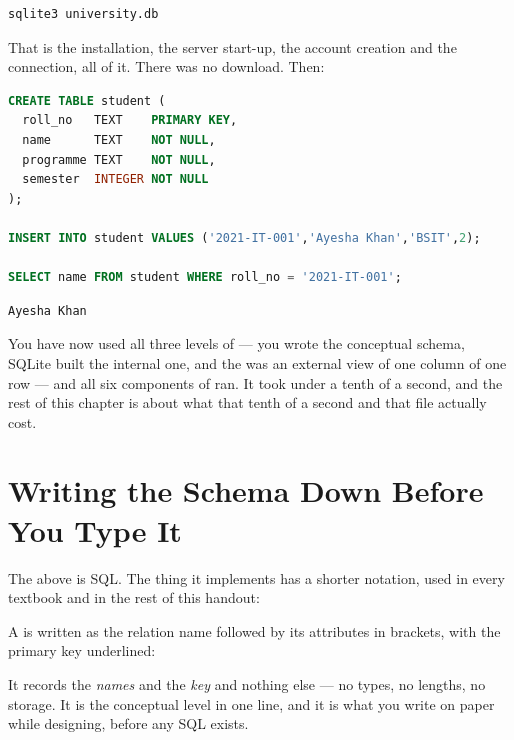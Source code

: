 \begin{lstlisting}[language=bash]
sqlite3 university.db
\end{lstlisting}

That is the installation, the server start-up, the account creation and the
connection, all of it. There was no download. Then:

\begin{lstlisting}[language=sql]
CREATE TABLE student (
  roll_no   TEXT    PRIMARY KEY,
  name      TEXT    NOT NULL,
  programme TEXT    NOT NULL,
  semester  INTEGER NOT NULL
);

INSERT INTO student VALUES ('2021-IT-001','Ayesha Khan','BSIT',2);

SELECT name FROM student WHERE roll_no = '2021-IT-001';
\end{lstlisting}

\begin{lstlisting}
Ayesha Khan
\end{lstlisting}

You have now used all three levels of  --- you wrote the
conceptual schema, SQLite built the internal one, and the  was an
external view of one column of one row --- and all six components of
 ran. It took under a tenth of a second, and the rest of
this chapter is about what that tenth of a second and that file actually cost.

\section{Writing the Schema Down Before You Type It}

The  above is SQL. The thing it implements has a shorter
notation, used in every textbook and in the rest of this handout:

\begin{definitionbox}
A  is written as the relation name followed by its
attributes in brackets, with the primary key underlined:

\medskip
\centerline{}

\medskip
It records the \emph{names} and the \emph{key} and nothing else --- no types,
no lengths, no storage. It is the conceptual level in one line, and it is what
you write on paper while designing, before any SQL exists.
\end{definitionbox}

